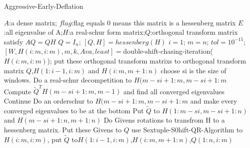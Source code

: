 \renewcommand{\algorithmicrequire}{\textbf{Input:}}
\renewcommand{\algorithmicensure}{\textbf{Output:}}
\begin{breakablealgorithm}
  \caption{Aggressive-Early-Deflation}
  \label{alg::Aggressive-Early-Deflation}
  \begin{algorithmic}[1]
  \Require $A$:a dense matrix; $flag$:flag equals 0 means this matrix is a hessenberg matrix
  \Ensure $E$:all eigenvalue of A;$H$:a real-schur form matrix;$Q$:orthogonal transform matrix satisfy \(AQ=QH\)
  \State\(Q={I_n}\);
    \State\([Q,H]=hessenberg(H)\)
  \EndIf
  \State\(i=1\);
  \State\(m=n\);
  \State\(tol={10^{-15}}\);
  \State\([W,H(i:m,i:m),m,k,Ava,least]=\)double-shift-chasing-iteration(\(H(i:m,i:m)\));
  \State put these orthogonal transform matrixs to orthogonal transform matrix $Q$,\(H(1:i-1,i:m)\) and \(H(i:m,m+1:n)\)
  \State choose si is the size of windows.
  \State Do a real-schur decompetition to \(H(m-si+1:m,m-si+1:m\)
  \State Compute \({\widetilde Q^T}H(m - si + 1:m,m - 1)\) and find all converged eigenvalues
    \State Continue
  \EndIf
  \State Do an orderschur to \(H(m-si+1:m,m-si+1:m\) and make every converged eigenvalues to be at the bottom
  \State Put \({\widetilde Q}\) to \(H(1:m-si,m-si+1:n)\) and \(H(m-si+1:n,m+1:n)\)
  \State Do Givens rotations to transfrom H to a hessenberg matrix. Put these Givens to \(Q\)
  \EndWhile
  \State use Sextuple-S0hift-QR-Algorithm to\(H(i:m,i:m)\), put \(\widetilde Q\) to\(H(1:i-1,i:m)\),\(H(i:m,m+1:n)\),\(Q(1:n,i:m)\)
  \end{algorithmic}
\end{breakablealgorithm}
